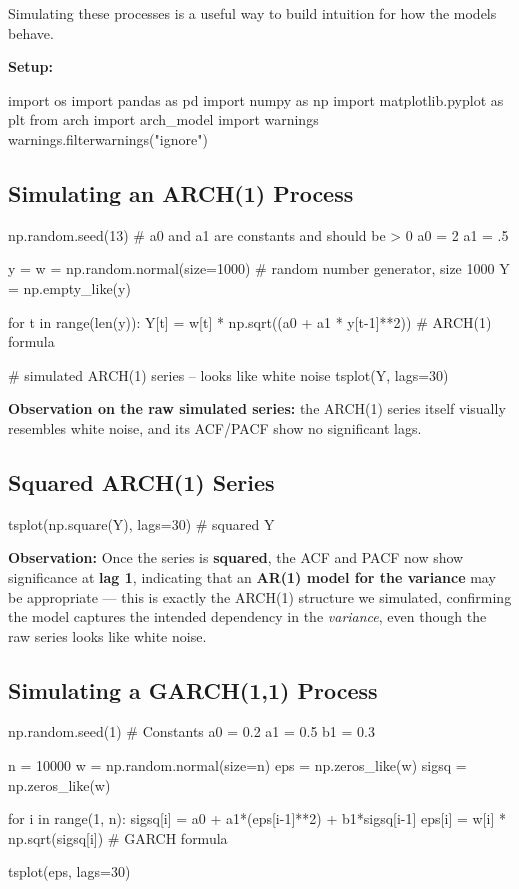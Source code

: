 \documentclass[12pt,openany]{book}
\theoremstyle{definition}
\theoremstyle{remark}
\begin{document}
Simulating these processes is a useful way to build intuition for how the models behave.

\textbf{Setup:}
\begin{python}
import os
import pandas as pd
import numpy as np
import matplotlib.pyplot as plt
from arch import arch_model
import warnings
warnings.filterwarnings("ignore")
\end{python}

\subsection{Simulating an ARCH(1) Process}

\begin{python}
np.random.seed(13)
# a0 and a1 are constants and should be > 0
a0 = 2
a1 = .5

y = w = np.random.normal(size=1000)   # random number generator, size 1000
Y = np.empty_like(y)

for t in range(len(y)):
    Y[t] = w[t] * np.sqrt((a0 + a1 * y[t-1]**2))   # ARCH(1) formula

# simulated ARCH(1) series -- looks like white noise
tsplot(Y, lags=30)
\end{python}

\textbf{Observation on the raw simulated series:} the ARCH(1) series itself visually resembles white noise, and its ACF/PACF show no significant lags.

\subsection{Squared ARCH(1) Series}

\begin{python}
tsplot(np.square(Y), lags=30)   # squared Y
\end{python}

\textbf{Observation:} Once the series is \textbf{squared}, the ACF and PACF now show significance at \textbf{lag 1}, indicating that an \textbf{AR(1) model for the variance} may be appropriate — this is exactly the ARCH(1) structure we simulated, confirming the model captures the intended dependency in the \emph{variance}, even though the raw series looks like white noise.

\subsection{Simulating a GARCH(1,1) Process}

\begin{python}
np.random.seed(1)
# Constants
a0 = 0.2
a1 = 0.5
b1 = 0.3

n = 10000
w = np.random.normal(size=n)
eps = np.zeros_like(w)
sigsq = np.zeros_like(w)

for i in range(1, n):
    sigsq[i] = a0 + a1*(eps[i-1]**2) + b1*sigsq[i-1]
    eps[i] = w[i] * np.sqrt(sigsq[i])     # GARCH formula

tsplot(eps, lags=30)
\end{python}
\end{document}
